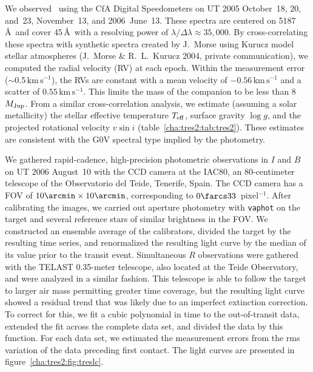 We observed
\tresTwo\ using the CfA Digital Speedometers \citep{Latham:ASP:1992a} on
UT 2005 October~18, 20, and~23, November~13, and 2006~June~13.
These spectra are centered on 5187\,\AA\ and cover 45\,\AA\ with
a resolving power of $\lambda / \Delta \lambda \approx 35,\!000$. By
cross-correlating these spectra with synthetic spectra created by
J.~Morse using Kurucz model stellar atmospheres (J.~Morse \&
R.~L.~Kurucz 2004, private communication), we computed the radial
velocity (RV) at each epoch. Within the measurement error
($\sim$0.5\,$\mathrm{km\,s^{-1}}$), the RVs are
constant with a mean velocity of $-0.56\,\mathrm{km\,s^{-1}}$ and a
scatter of $0.55\,\mathrm{km\,s^{-1}}$.
This limits the mass of the companion to be less than 8\,$M_{\rm Jup}$.
From a similar cross-correlation analysis, we
estimate (assuming a solar metallicity) the stellar effective
temperature $T_{\rm eff}$, surface gravity $\log{g}$, and the
projected rotational velocity $v \sin{i}$ (table~\ref{cha:tres2:tab:tres2}).
These estimates are consistent with the G0V spectral type implied by
the photometry.

We gathered rapid-cadence, high-precision photometric observations in
$I$ and $B$ on UT 2006 August~10 with the CCD camera at the IAC80, an
80-centimeter telescope of the Observatorio del Teide, Tenerife, Spain. The
CCD camera has a FOV of $10\arcmin\times10\arcmin$, corresponding to
$0\farcs33$~pixel$^{-1}$. After calibrating the images, we carried out
aperture photometry with \texttt{vaphot} \citep{Deeg_Doyle:2001a} on the target
and several reference stars of similar brightness in the FOV.  We
constructed an ensemble average of the calibrators, divided the target
by the resulting time series, and renormalized the resulting light
curve by the median of its value prior to the transit event.
Simultaneous $R$ observations were gathered with the TELAST 0.35-meter
telescope, also located at the Teide Observatory, and were analyzed in
a similar fashion.  This telescope is able to follow the target to
larger air mass permitting greater time coverage, but the resulting
light curve showed a residual trend that was likely due to an
imperfect extinction correction. To correct for this, we fit a cubic
polynomial in time to the out-of-transit data, extended the fit across
the complete data set, and divided the data by this function. For each
data set, we estimated the measurement errors from the rms variation of
the data preceding first contact.  The light curves are presented in
figure~\ref{cha:tres2:fig:treslc}.

